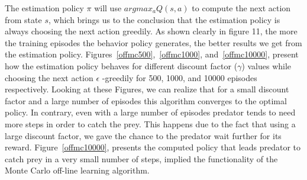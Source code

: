 \documentclass[a4paper,11pt]{article}
\begin{document}
The estimation policy $\pi$ will use $argmax_aQ(s,a)$ to compute the next action from state $s$, which brings us to the conclusion that the estimation policy is always choosing the next action greedily. As shown clearly in figure 11, the more the training episodes the behavior policy generates, the better results we get from the estimation policy. Figures~\ref{offmc500},~\ref{offmc1000}, and~\ref{offmc10000}, present how the estimation policy behaves for different discount factor ($\gamma$) values while choosing the next action $\epsilon$ -greedily for 500, 1000, and 10000 episodes respectively. Looking at these Figures, we can realize that for a small discount factor and a large number of episodes this algorithm converges to the optimal policy. In contrary, even with a large number of episodes predator tends to need more steps in order to catch the prey. This happens due to the fact that using a large discount factor, we gave the chance to the predator wait further for its reward. Figure~\ref{offmc10000}, presents the computed policy that leads predator to catch prey in a very small number of steps, implied the functionality of the Monte Carlo off-line learning algorithm. 
\end{document}
